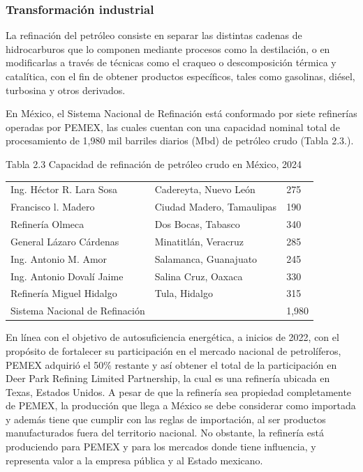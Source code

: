 \documentclass{sener2025}
\begin{document}
\subsubsection{Transformación industrial}

La refinación del petróleo consiste en separar las distintas cadenas de hidrocarburos que lo componen mediante procesos como la destilación, o en modificarlas a través de técnicas como el craqueo o descomposición térmica y catalítica, con el fin de obtener productos específicos, tales como gasolinas, diésel, turbosina y otros derivados.

En México, el Sistema Nacional de Refinación está conformado por siete refinerías operadas por PEMEX, las cuales cuentan con una capacidad nominal total de procesamiento de 1,980 mil barriles diarios (Mbd) de petróleo crudo (Tabla 2.3.).

\begin{tabladoradoCorto}
  \caption{Tabla 2.3 Capacidad de refinación de petróleo crudo en México, 2024}
  \label{tab:tabla_2_3_capacidad_de_refinac}
  \begin{tabularx}{\textwidth}{Vvv}
    \toprule
      &  &  \\
    \midrule
    Ing. Héctor R. Lara Sosa & Cadereyta, Nuevo León & 275 \\
    Francisco l. Madero & Ciudad Madero, Tamaulipas & 190 \\
    Refinería Olmeca & Dos Bocas, Tabasco & 340 \\
    General Lázaro Cárdenas & Minatitlán, Veracruz & 285 \\
    Ing. Antonio M. Amor & Salamanca, Guanajuato & 245 \\
    Ing. Antonio Dovalí Jaime & Salina Cruz, Oaxaca & 330 \\
    Refinería Miguel Hidalgo & Tula, Hidalgo & 315 \\
    Sistema Nacional de Refinación &  & 1,980 \\
    \bottomrule
  \end{tabularx}
\end{tabladoradoCorto}
\vspace{-4pt}


En línea con el objetivo de autosuficiencia energética, a inicios de 2022, con el propósito de fortalecer su participación en el mercado nacional de petrolíferos, PEMEX adquirió el 50\% restante y así obtener el total de la participación en Deer Park Refining Limited Partnership, la cual es una refinería ubicada en Texas, Estados Unidos. A pesar de que la refinería sea propiedad completamente de PEMEX, la producción que llega a México se debe considerar como importada y además tiene que cumplir con las reglas de importación, al ser productos manufacturados fuera del territorio nacional. No obstante, la refinería está produciendo para PEMEX y para los mercados donde tiene influencia, y representa valor a la empresa pública y al Estado mexicano.
\end{document}
